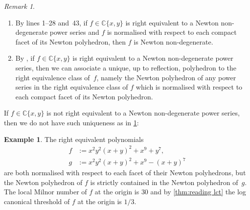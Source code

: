 \documentclass[a4paper, 12pt, oneside]{article}
\theoremstyle{plain}
\theoremstyle{definition}
\newtheorem{example}[theorem]{Example}
\theoremstyle{remark}
\newtheorem{remark}[theorem]{Remark}
\numberwithin{theorem}{section}
\numberwithin{table}{section}
\numberwithin{equation}{theorem}
\begin{document}
\begin{remark} \label{rem:if equiv to NND}
\begin{enumerate}[label=(\alph*), ref=\alph*]
\item By \cite[Algorithm~4]{BMP20} lines 1--28 and~43, if $f \in \mathbb C\{x, y\}$ is right equivalent to a Newton non-degenerate power series and $f$ is normalised with respect to each compact facet of its Newton polyhedron, then $f$ is Newton non-degenerate.
\item \label{itm:unique polyhedron} By \cite[Remarks 3.27 and~3.28]{BMP20}, if $f \in \mathbb C\{x, y\}$ is right equivalent to a Newton non-degenerate power series, then we can associate a unique, up to reflection, polyhedron to the right equivalence class of~$f$, namely the Newton polyhedron of any power series in the right equivalence class of $f$ which is normalised with respect to each compact facet of its Newton polyhedron.
\end{enumerate}
\end{remark}

If $f \in \mathbb C\{x, y\}$ is not right equivalent to a Newton non-degenerate power series, then we do not have such uniqueness as in \cref{rem:if equiv to NND}:

\begin{example} \label{exa:two normalised Newton polyhedrons}
The right equivalent polynomials
\[
\begin{aligned}
  f & := x^2 y^2 (x+y)^2 + x^9 + y^7,\\
  g & := x^2 y^2 (x+y)^2 + x^9 - (x+y)^7
\end{aligned}
\]
are both normalised with respect to each facet of their Newton polyhedrons, but the Newton polyhedron of $f$ is strictly contained in the Newton polyhedron of~$g$. The local Milnor number of $f$ at the origin is $30$ and by \cref{thm:reading lct} the log canonical threshold of $f$ at the origin is $1/3$.
\end{example}
\end{document}
